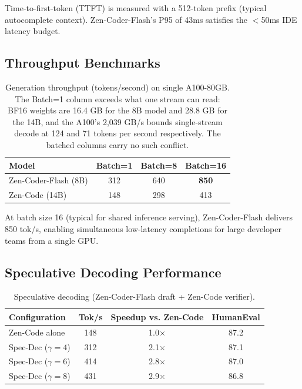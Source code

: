 \documentclass[11pt,a4paper]{article}
\begin{document}
Time-to-first-token (TTFT) is measured with a 512-token prefix (typical autocomplete context).
Zen-Coder-Flash's P95 of 43ms satisfies the $<$50ms IDE latency budget.

\subsection{Throughput Benchmarks}

\begin{table}[H]
\centering
\caption{Generation throughput (tokens/second) on single A100-80GB. The Batch=1
column exceeds what one stream can read: BF16 weights are 16.4 GB for the 8B model and
28.8 GB for the 14B, and the A100's 2{,}039 GB/s bounds single-stream decode at 124 and
71 tokens per second respectively. The batched columns carry no such conflict.}
\label{tab:throughput}
\begin{tabular}{lccc}
\toprule
\textbf{Model} & \textbf{Batch=1} & \textbf{Batch=8} & \textbf{Batch=16} \\
\midrule
Zen-Coder-Flash (8B) & 312 & 640 & \textbf{850} \\
Zen-Code (14B)       & 148 & 298 & 413 \\
\bottomrule
\end{tabular}
\end{table}

At batch size 16 (typical for shared inference serving), Zen-Coder-Flash delivers 850 tok/s,
enabling simultaneous low-latency completions for large developer teams from a single GPU.

\subsection{Speculative Decoding Performance}

\begin{table}[H]
\centering
\caption{Speculative decoding (Zen-Coder-Flash draft + Zen-Code verifier).}
\label{tab:spec_dec}
\begin{tabular}{lccc}
\toprule
\textbf{Configuration} & \textbf{Tok/s} & \textbf{Speedup vs. Zen-Code} & \textbf{HumanEval} \\
\midrule
Zen-Code alone              & 148  & 1.0$\times$ & 87.2 \\
Spec-Dec ($\gamma=4$)       & 312  & 2.1$\times$ & 87.1 \\
Spec-Dec ($\gamma=6$)       & 414  & 2.8$\times$ & 87.0 \\
Spec-Dec ($\gamma=8$)       & 431  & 2.9$\times$ & 86.8 \\
\bottomrule
\end{tabular}
\end{table}
\end{document}
